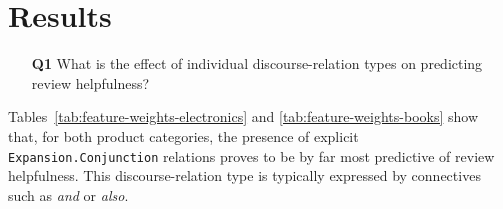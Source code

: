 \documentclass[
    a4paper,%
    12pt,%
    oneside,%
    toc=bibliography,
    final,
]{scrartcl}
\begin{document}
\section{Results}
\label{sec:results}


\begin{enumerate}[rightmargin=1cm]
\item[\textbf{Q1}] What is the effect of individual discourse-relation types on predicting review helpfulness?
\end{enumerate}

Tables~\ref{tab:feature-weights-electronics} and \ref{tab:feature-weights-books} show that, for both product categories, the presence of explicit \lstinline|Expansion.Conjunction| relations proves to be by far most predictive of review helpfulness. This discourse-relation type is typically expressed by connectives such as \textit{and} or \textit{also}.
\end{document}
